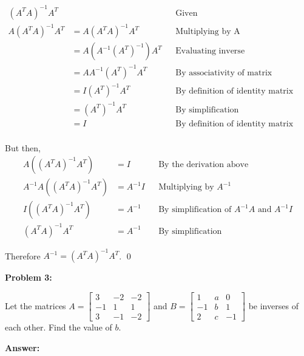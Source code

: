\documentclass[10pt,letterpaper,final]{report}
\newcommand{\reason}[1]{&& \text{#1}}
\begin{document}
\begin{align*}
  (A^T A)^{-1} A^T  & \reason{Given}                                                             \\
  A(A^T A)^{-1} A^T & = A(A^T A)^{-1} A^T \reason{Multiplying by A}                              \\
                    & = A(A^{-1}(A^T)^{-1}) A^T \reason{Evaluating inverse}                      \\
                    & = AA^{-1}(A^T)^{-1} A^T \reason{By associativity of matrix multiplication} \\
                    & = I(A^T)^{-1} A^T \reason{By definition of identity matrix}                \\
                    & = (A^T)^{-1} A^T \reason{By simplification}                                \\
                    & = I \reason{By definition of identity matrix}                              \\
\end{align*}

But then,
\begin{align*}
  A((A^T A)^{-1} A^T)       & = I \reason{By the derivation above}                           \\
  A^{-1}A((A^T A)^{-1} A^T) & = A^{-1}I \reason{Multiplying by $A^{-1}$}                     \\
  I((A^T A)^{-1} A^T)       & = A^{-1} \reason{By simplification of $A^{-1}A$ and $A^{-1}I$} \\
  (A^T A)^{-1} A^T          & = A^{-1} \reason{By simplification}
\end{align*}

Therefore $A^{-1} = (A^T A)^{-1} A^T$. \qed

\pagebreak

\noindent\textbf{Problem 3:}
\medskip

Let the matrices $A = \begin{bmatrix}
    3  & -2 & -2 \\
    -1 & 1  & 1  \\
    3  & -1 & -2
  \end{bmatrix}$ and $B = \begin{bmatrix}
    1  & a & 0  \\
    -1 & b & 1  \\
    2  & c & -1
  \end{bmatrix}$ be inverses of each other. Find the value of $b$.


\medskip
\noindent\textbf{Answer:}
\medskip
\end{document}
